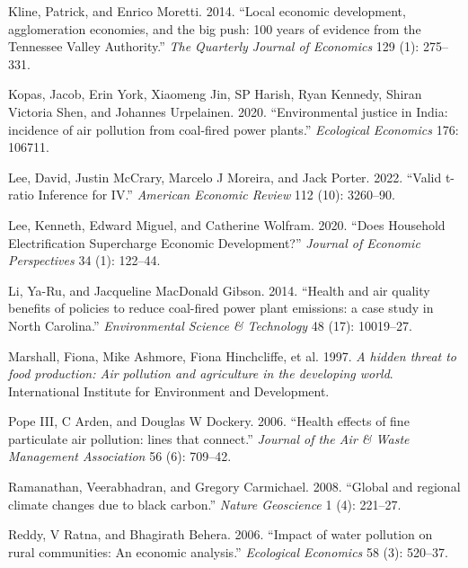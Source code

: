 \documentclass[
]{article}
\newlength{\cslhangindent}
\newlength{\cslentryspacingunit} %
\newenvironment{CSLReferences}[2] %
 {%
  \setlength{\parindent}{0pt}
  \ifodd #1
  \let\oldpar\par
  \def\par{\hangindent=\cslhangindent\oldpar}
  \fi
  \setlength{\parskip}{#2\cslentryspacingunit}
 }%
 {}
\begin{document}
\begin{CSLReferences}{1}{0}
\leavevmode{}%
Kline, Patrick, and Enrico Moretti. 2014. {``{Local economic development, agglomeration economies, and the big push: 100 years of evidence from the Tennessee Valley Authority}.''} \emph{The Quarterly Journal of Economics} 129 (1): 275--331.

\leavevmode{}%
Kopas, Jacob, Erin York, Xiaomeng Jin, SP Harish, Ryan Kennedy, Shiran Victoria Shen, and Johannes Urpelainen. 2020. {``{Environmental justice in India: incidence of air pollution from coal-fired power plants}.''} \emph{{Ecological Economics}} 176: 106711.

\leavevmode{}%
Lee, David, Justin McCrary, Marcelo J Moreira, and Jack Porter. 2022. {``{Valid t-ratio Inference for IV}.''} \emph{{American Economic Review}} 112 (10): 3260--90.

\leavevmode{}%
Lee, Kenneth, Edward Miguel, and Catherine Wolfram. 2020. {``Does Household Electrification Supercharge Economic Development?''} \emph{{Journal of Economic Perspectives}} 34 (1): 122--44.

\leavevmode{}%
Li, Ya-Ru, and Jacqueline MacDonald Gibson. 2014. {``{Health and air quality benefits of policies to reduce coal-fired power plant emissions: a case study in North Carolina}.''} \emph{{Environmental Science \& Technology}} 48 (17): 10019--27.

\leavevmode{}%
Marshall, Fiona, Mike Ashmore, Fiona Hinchcliffe, et al. 1997. \emph{{A hidden threat to food production: Air pollution and agriculture in the developing world}}. {International Institute for Environment and Development.}

\leavevmode{}%
Pope III, C Arden, and Douglas W Dockery. 2006. {``{Health effects of fine particulate air pollution: lines that connect}.''} \emph{{Journal of the Air \& Waste Management Association}} 56 (6): 709--42.

\leavevmode{}%
Ramanathan, Veerabhadran, and Gregory Carmichael. 2008. {``{Global and regional climate changes due to black carbon}.''} \emph{{Nature Geoscience}} 1 (4): 221--27.

\leavevmode{}%
Reddy, V Ratna, and Bhagirath Behera. 2006. {``{Impact of water pollution on rural communities: An economic analysis}.''} \emph{{Ecological Economics}} 58 (3): 520--37.


\end{CSLReferences}
\end{document}
